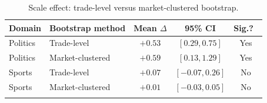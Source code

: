 \documentclass[numsec,webpdf,modern,medium]{oup-authoring-template}
\theoremstyle{thmstyleone}%
\theoremstyle{thmstyletwo}%
\theoremstyle{thmstylethree}%
\begin{document}
\begin{appendices}
\begin{table}[!t]
\caption{Scale effect: trade-level versus market-clustered bootstrap.\label{tab:bootstrap}}%
\begin{tabular*}{\columnwidth}{@{\extracolsep\fill}llccc@{\extracolsep\fill}}
\toprule
Domain & Bootstrap method & Mean $\Delta$ & 95\% CI & Sig.?\ \\
\midrule
Politics & Trade-level      & $+0.53$ & $[0.29, 0.75]$    & Yes \\
Politics & Market-clustered & $+0.59$ & $[0.13, 1.29]$    & Yes \\
Sports   & Trade-level      & $+0.07$ & $[-0.07, 0.26]$   & No  \\
Sports   & Market-clustered & $+0.01$ & $[-0.03, 0.05]$   & No  \\
\botrule
\end{tabular*}
\end{table}


\end{appendices}
\end{document}
